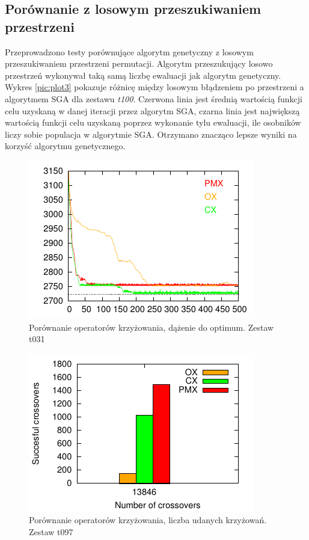 \documentclass[12pt]{article}
\begin{document}
\subsection{Porównanie z losowym przeszukiwaniem przestrzeni}

Przeprowadzono testy porównujące algorytm genetyczny z losowym
przeszukiwaniem przestrzeni permutacji. Algorytm przeszukujący losowo
przestrzeń wykonywał taką samą liczbę ewaluacji jak algorytm
genetyczny. Wykres \ref{pic:plot3} pokazuje różnicę między losowym błądzeniem po przestrzeni
a algorytmem SGA dla zestawu {\em t100}. Czerwona linia jest średnią wartością funkcji celu uzyskaną
w danej iteracji przez algorytm SGA, czarna linia jest największą wartością funkcji celu uzyskaną
poprzez wykonanie tylu ewaluacji, ile osobników liczy sobie populacja w algorytmie SGA.
Otrzymano znacząco lepsze wyniki na korzyść algorytmu genetycznego.

\begin{figure}[t]
  \centering
  \includegraphics[scale=1.1]{plots/plot4.pdf}
  \caption{Porównanie operatorów krzyżowania, dążenie do optimum. Zestaw t031}
  \label{pic:plot4}
\end{figure}

\begin{figure}[t]
  \centering
  \includegraphics[scale=1.1]{plots/plot5.pdf}
  \caption{Porównanie operatorów krzyżowania, liczba udanych krzyżowań. Zestaw t097}
  \label{pic:plot5}
\end{figure}
\end{document}
